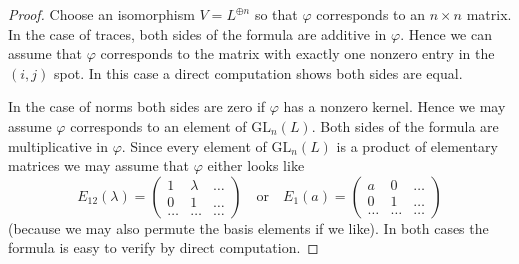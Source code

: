 \documentclass[10pt,a4paper]{amsart}
\theoremstyle{plain}
\theoremstyle{definition}
\theoremstyle{remark}
\numberwithin{equation}{subsection}
\begin{document}
\begin{proof}
Choose an isomorphism $V = L^{\oplus n}$ so that $\varphi$ corresponds
to an $n \times n$ matrix. In the case of traces, both sides of the formula
are additive in $\varphi$. Hence we can assume that $\varphi$
corresponds to the matrix with exactly one nonzero entry in the $(i, j)$ spot.
In this case a direct computation shows both sides are equal.

\medskip\noindent
In the case of norms both sides are zero if $\varphi$ has a nonzero kernel.
Hence we may assume $\varphi$ corresponds to an element of
$\text{GL}_n(L)$. Both sides of the formula are multiplicative in $\varphi$.
Since every element of $\text{GL}_n(L)$ is a product of elementary
matrices we may assume that $\varphi$ either looks like
$$
E_{12}(\lambda) =
\left(
\begin{matrix}
1 & \lambda & \ldots \\
0 & 1 & \ldots \\
\ldots & \ldots & \ldots
\end{matrix}
\right)
\quad\text{or}\quad
E_1(a) =
\left(
\begin{matrix}
a & 0 & \ldots \\
0 & 1 & \ldots \\
\ldots & \ldots & \ldots
\end{matrix}
\right)
$$
(because we may also permute the basis elements if we like).
In both cases the formula is easy to verify by direct computation.
\end{proof}
\end{document}
